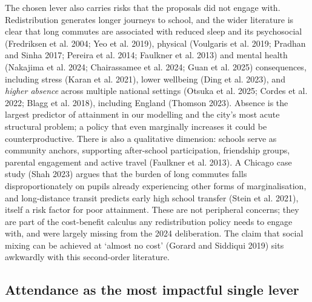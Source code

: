 \documentclass[
  12pt,
  titlepage]{article}
\begin{document}
The chosen lever also carries risks that the proposals did not engage
with. Redistribution generates longer journeys to school, and the wider
literature is clear that long commutes are associated with reduced sleep
and its psychosocial (Fredriksen et al. 2004; Yeo et al. 2019), physical
(Voulgaris et al. 2019; Pradhan and Sinha 2017; Pereira et al. 2014;
Faulkner et al. 2013) and mental health (Nakajima et al. 2024;
Chairassamee et al. 2024; Guan et al. 2025) consequences, including
stress (Karan et al. 2021), lower wellbeing (Ding et al. 2023), and
\emph{higher absence} across multiple national settings (Otsuka et al.
2025; Cordes et al. 2022; Blagg et al. 2018), including England (Thomson
2023). Absence is the largest predictor of attainment in our modelling
and the city's most acute structural problem; a policy that even
marginally increases it could be counterproductive. There is also a
qualitative dimension: schools serve as community anchors, supporting
after-school participation, friendship groups, parental engagement and
active travel (Faulkner et al. 2013). A Chicago case study (Shah 2023)
argues that the burden of long commutes falls disproportionately on
pupils already experiencing other forms of marginalisation, and
long-distance transit predicts early high school transfer (Stein et al.
2021), itself a risk factor for poor attainment. These are not
peripheral concerns; they are part of the cost-benefit calculus any
redistribution policy needs to engage with, and were largely missing
from the 2024 deliberation. The claim that social mixing can be achieved
at `almost no cost' (Gorard and Siddiqui 2019) sits awkwardly with this
second-order literature.

\subsection{Attendance as the most impactful single
lever}\label{attendance-as-the-most-impactful-single-lever}
\end{document}
